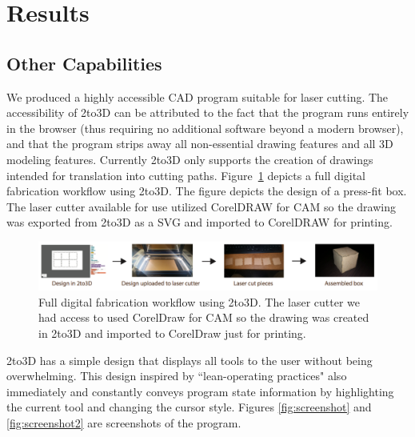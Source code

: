 \section{Results}

\subsection*{Other Capabilities}

We produced a highly accessible CAD program suitable for laser cutting. The accessibility of 2to3D can be attributed to the fact that the program runs entirely in the browser (thus requiring no additional software beyond a modern browser), and that the program strips away all non-essential drawing features and all 3D modeling features. Currently 2to3D only supports the creation of drawings intended for translation into cutting paths. Figure~\ref{fig:usingProgram} depicts a full digital fabrication workflow using 2to3D. The figure depicts the design of a press-fit box. The laser cutter available for use utilized CorelDRAW for CAM so the drawing was exported from 2to3D as a SVG and imported to CorelDRAW for printing.

\begin{figure}[H]
  \includegraphics[width=\linewidth]{usingProgram.jpg}
  \caption{Full digital fabrication workflow using 2to3D. The laser cutter we had access to used CorelDraw for CAM so the drawing was created in 2to3D and imported to CorelDraw just for printing.}
  \label{fig:usingProgram}
\end{figure}

2to3D has a simple design that displays all tools to the user without being overwhelming. This design inspired by ``lean-operating practices" also immediately and constantly conveys program state information by highlighting the current tool and changing the cursor style. Figures \ref{fig:screenshot} and \ref{fig:screenshot2} are screenshots of the program.


